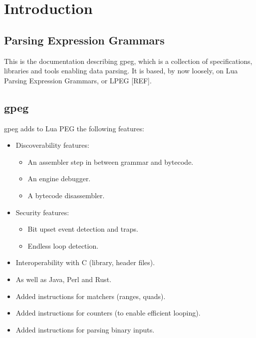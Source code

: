 \section{Introduction}

\subsection{Parsing Expression Grammars}

This is the documentation describing gpeg, which is a collection of
specifications, libraries and tools enabling data parsing. It is based, by
now loosely, on Lua Parsing Expression Grammars, or LPEG [REF].

\subsection{gpeg}

gpeg adds to Lua PEG the following features:

\begin{itemize}
\item Discoverability features:

  \begin{itemize}
  \item An assembler step in between grammar and bytecode.
  \item An engine debugger.
  \item A bytecode disassembler.
  \end{itemize}

\item Security features:

  \begin{itemize}
  \item Bit upset event detection and traps.
  \item Endless loop detection.
  \end{itemize}

\item Interoperability with C (library, header files).
\item As well as Java, Perl and Rust.
\item Added instructions for matchers (ranges, quads).
\item Added instructions for counters (to enable efficient looping).
\item Added instructions for parsing binary inputs.
\end{itemize}
